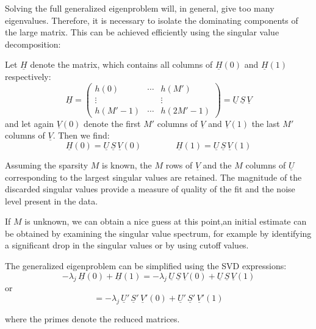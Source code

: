 Solving the full generalized eigenproblem will, in general, give too many eigenvalues. Therefore, it is necessary to isolate the dominating components of the large matrix. This can be achieved efficiently using the singular value decomposition:

Let $\underline{H}$ denote the matrix, which contains all columns of $\underline{H}(0)$ and $\underline{H}(1)$ respectively:
\begin{equation*}
    \underline{H} = \begin{pmatrix} h(0) & \cdots & h(M') \\ \vdots & & \vdots \\ h(M'-1) & \cdots & h(2M'-1) \end{pmatrix} = \underline{U}\,\underline{S}\,\underline{V}
\end{equation*}
and let again $\underline{V}(0)$ denote the first $M'$ columns of $\underline{V}$ and $\underline{V}(1)$ the last $M'$ columns of $\underline{V}$. Then we find:
\begin{equation*}
    \underline{H}(0) = \underline{U}\,\underline{S}\,\underline{V}(0) \qquad\qquad \underline{H}(1) = \underline{U}\,\underline{S}\,\underline{V}(1)
\end{equation*}

Assuming the sparsity $M$ is known, the $M$ rows of $\underline{V}$ and the $M$ columns of $\underline{U}$ corresponding to the largest singular values are retained. The magnitude of the discarded singular values provide a measure of quality of the fit and the noise level present in the data.

If $M$ is unknown, we can obtain a nice guess at this point,an initial estimate can be obtained by examining the singular value spectrum, for example by identifying a significant drop in the singular values or by using cutoff values.

The generalized eigenproblem can be simplified using the SVD expressions:
\begin{equation*}
    -\lambda_j\, \underline{H}(0) + \underline{H}(1) = -\lambda_j\, \underline{U}\,\underline{S}\,\underline{V}(0) + \underline{U}\,\underline{S}\,\underline{V}(1)
\end{equation*}
or
\begin{equation*}
    = -\lambda_j\, \underline{U}'\,\underline{S}'\,\underline{V}'(0) + \underline{U}'\,\underline{S}'\,\underline{V}'(1)
\end{equation*}

where the primes denote the reduced matrices.

